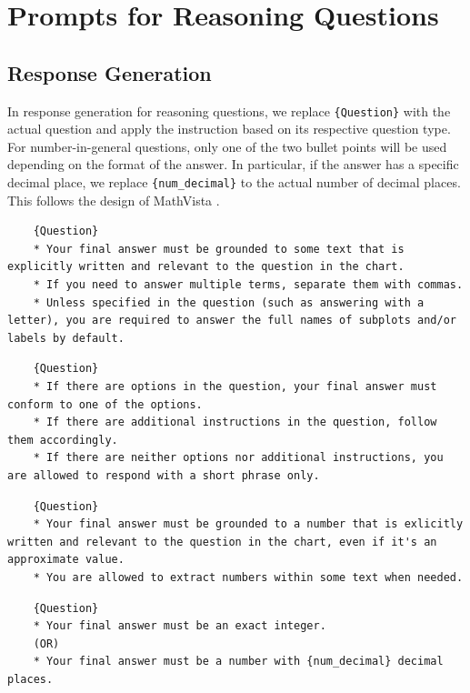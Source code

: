 \newpage
\section{Prompts for Reasoning Questions}
\subsection{Response Generation}
\label{subsec:resp_generation_reas}
In response generation for reasoning questions, we replace \texttt{\{Question\}} with the actual question and apply the instruction based on its respective question type. For number-in-general questions, only one of the two bullet points will be used depending on the format of the answer. In particular, if the answer has a specific decimal place, we replace \texttt{\{num\_decimal\}} to the actual number of decimal places. This follows the design of MathVista \cite{lu2024mathvista}.

\begin{example}
\begin{lstlisting}
    {Question}
    * Your final answer must be grounded to some text that is explicitly written and relevant to the question in the chart.
    * If you need to answer multiple terms, separate them with commas.
    * Unless specified in the question (such as answering with a letter), you are required to answer the full names of subplots and/or labels by default.
\end{lstlisting}
\end{example}

\begin{example}
\begin{lstlisting}
    {Question}
    * If there are options in the question, your final answer must conform to one of the options.
    * If there are additional instructions in the question, follow them accordingly.
    * If there are neither options nor additional instructions, you are allowed to respond with a short phrase only.
\end{lstlisting}
\end{example}

\begin{example}
\begin{lstlisting}
    {Question}
    * Your final answer must be grounded to a number that is exlicitly written and relevant to the question in the chart, even if it's an approximate value.
    * You are allowed to extract numbers within some text when needed.
\end{lstlisting}
\end{example}
\begin{example}
\begin{lstlisting}
    {Question}
    * Your final answer must be an exact integer.
    (OR)
    * Your final answer must be a number with {num_decimal} decimal places.
\end{lstlisting}
\end{example}

